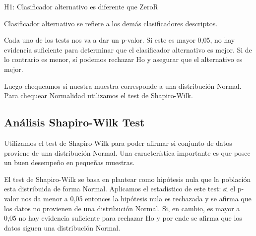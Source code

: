 \hspace{2cm}H1: Clasificador alternativo es diferente que ZeroR
\vspace{0.5cm}

Clasificador alternativo se refiere a los demás clasificadores descriptos. 

Cada uno de los tests nos va a dar un p-valor. Si este es mayor 0,05, no hay evidencia suficiente para determinar que el clasificador alternativo es mejor. Si de lo contrario es menor, sí podemos rechazar Ho y asegurar que el alternativo es mejor. 

Luego chequeamos si nuestra muestra corresponde a una distribución Normal. Para chequear Normalidad utilizamos el test de Shapiro-Wilk.

\subsection{Análisis Shapiro-Wilk Test}



Utilizamos el test de Shapiro-Wilk para poder afirmar si conjunto de datos proviene de una distribución Normal. Una característica importante es que posee un buen desempeño en pequeñas muestras.


El test de Shapiro-Wilk se basa en plantear como hipótesis nula que la población esta distribuida de forma Normal. Aplicamos el estadístico de este test: si el p-valor nos da menor a 0,05 entonces la hipótesis nula es rechazada y se afirma que los datos no provienen de una distribución Normal. Si, en cambio, es mayor a 0,05 no hay evidencia suficiente  para rechazar Ho y por ende se afirma que los datos siguen una distribución Normal.

